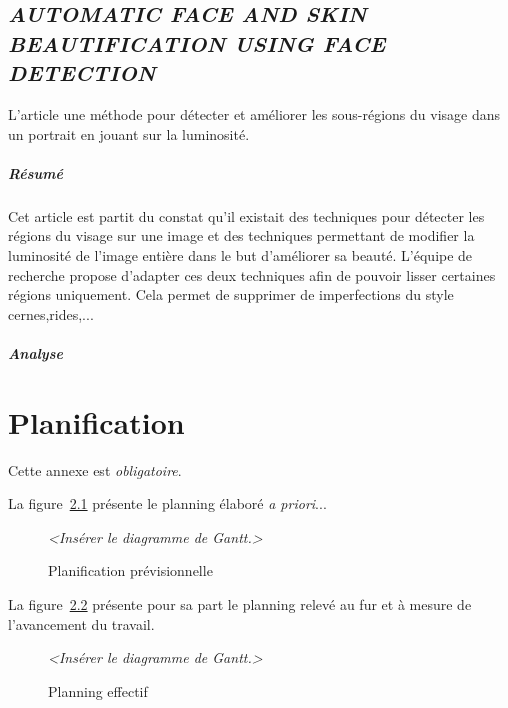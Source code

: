 \documentclass[11pt, french]{report-rd-info}
\begin{document}
\section{\emph{AUTOMATIC FACE AND SKIN BEAUTIFICATION USING FACE DETECTION}}
L'article \cite{Ciuc} une méthode pour détecter et améliorer les sous-régions du visage dans un portrait en jouant sur la luminosité.

\paragraph{Résumé}
Cet article est partit du constat qu'il existait des techniques pour détecter les régions du visage sur une image et des techniques permettant de modifier la luminosité de l'image entière dans le but d'améliorer sa beauté. L'équipe de recherche propose d'adapter ces deux techniques afin de pouvoir lisser certaines régions uniquement. Cela permet de supprimer de imperfections du style cernes,rides,...

\paragraph{Analyse}

\chapter{Planification}

Cette annexe est \emph{obligatoire}.

La figure~\ref{fig:PlanningPrevisionnel} présente le planning élaboré \emph{a priori}...

\begin{figure}
	\centering
		\emph{<Insérer le diagramme de Gantt.>}
	\caption{Planification prévisionnelle}
	\label{fig:PlanningPrevisionnel}
\end{figure}

La figure~\ref{fig:PlanningEffectif} présente pour sa part le planning relevé au fur et à mesure de l'avancement du travail.

\begin{figure}
	\centering
		\emph{<Insérer le diagramme de Gantt.>}
	\caption{Planning effectif}
	\label{fig:PlanningEffectif}
\end{figure}
\end{document}
